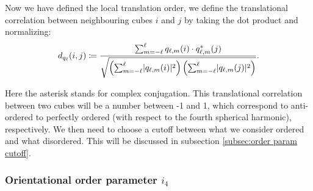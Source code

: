 \documentclass[thesis]{subfiles}
\begin{document}
Now we have defined the local translation order, we define the translational correlation between neighbouring cubes $i$ and $j$ by taking the dot product and normalizing:
\begin{equation}
	d_{q_\ell}(i, j) \coloneqq \frac{\sum_{m = -\ell}^\ell q_{\ell, m}(i) \cdot q^*_{\ell, m}(j)}{\sqrt{\left(\sum_{m = -\ell}^\ell \lvert q_{\ell, m}(i)\rvert^2\right) \left(\sum_{m = -\ell}^\ell \lvert q_{\ell, m}(j)\rvert^2\right)}}.
\end{equation}

Here the asterisk stands for complex conjugation. This translational correlation between two cubes will be a number between -1 and 1, which correspond to anti-ordered to perfectly ordered (with respect to the fourth spherical harmonic), respectively. We then need to choose a cutoff between what we consider ordered and what disordered. 
This will be discussed in subsection \ref{subsec:order param cutoff}.

\subsubsection{Orientational order parameter \texorpdfstring{$i_4$}{i4}} \label{subsubsec:orient order param}
\end{document}
